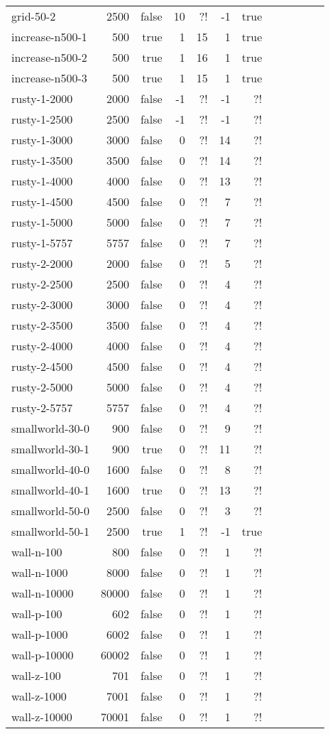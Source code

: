 \documentclass[a4paper]{article}
\begin{document}
\begin{longtable}{lrrrrrrrrrrr}
	grid-50-2 & 2500 & false & 10 & ?! & -1 & true\\
	increase-n500-1 & 500 & true & 1 & 15 & 1 & true\\
	increase-n500-2 & 500 & true & 1 & 16 & 1 & true\\
	increase-n500-3 & 500 & true & 1 & 15 & 1 & true\\
	rusty-1-2000 & 2000 & false & -1 & ?! & -1 & ?!\\
	rusty-1-2500 & 2500 & false & -1 & ?! & -1 & ?!\\
	rusty-1-3000 & 3000 & false & 0 & ?! & 14 & ?!\\
	rusty-1-3500 & 3500 & false & 0 & ?! & 14 & ?!\\
	rusty-1-4000 & 4000 & false & 0 & ?! & 13 & ?!\\
	rusty-1-4500 & 4500 & false & 0 & ?! & 7 & ?!\\
	rusty-1-5000 & 5000 & false & 0 & ?! & 7 & ?!\\
	rusty-1-5757 & 5757 & false & 0 & ?! & 7 & ?!\\
	rusty-2-2000 & 2000 & false & 0 & ?! & 5 & ?!\\
	rusty-2-2500 & 2500 & false & 0 & ?! & 4 & ?!\\
	rusty-2-3000 & 3000 & false & 0 & ?! & 4 & ?!\\
	rusty-2-3500 & 3500 & false & 0 & ?! & 4 & ?!\\
	rusty-2-4000 & 4000 & false & 0 & ?! & 4 & ?!\\
	rusty-2-4500 & 4500 & false & 0 & ?! & 4 & ?!\\
	rusty-2-5000 & 5000 & false & 0 & ?! & 4 & ?!\\
	rusty-2-5757 & 5757 & false & 0 & ?! & 4 & ?!\\
	smallworld-30-0 & 900 & false & 0 & ?! & 9 & ?!\\
	smallworld-30-1 & 900 & true & 0 & ?! & 11 & ?!\\
	smallworld-40-0 & 1600 & false & 0 & ?! & 8 & ?!\\
	smallworld-40-1 & 1600 & true & 0 & ?! & 13 & ?!\\
	smallworld-50-0 & 2500 & false & 0 & ?! & 3 & ?!\\
	smallworld-50-1 & 2500 & true & 1 & ?! & -1 & true\\
	wall-n-100 & 800 & false & 0 & ?! & 1 & ?!\\
	wall-n-1000 & 8000 & false & 0 & ?! & 1 & ?!\\
	wall-n-10000 & 80000 & false & 0 & ?! & 1 & ?!\\
	wall-p-100 & 602 & false & 0 & ?! & 1 & ?!\\
	wall-p-1000 & 6002 & false & 0 & ?! & 1 & ?!\\
	wall-p-10000 & 60002 & false & 0 & ?! & 1 & ?!\\
	wall-z-100 & 701 & false & 0 & ?! & 1 & ?!\\
	wall-z-1000 & 7001 & false & 0 & ?! & 1 & ?!\\
	wall-z-10000 & 70001 & false & 0 & ?! & 1 & ?!\\

	\bottomrule
\end{longtable}
\medskip
\end{document}
